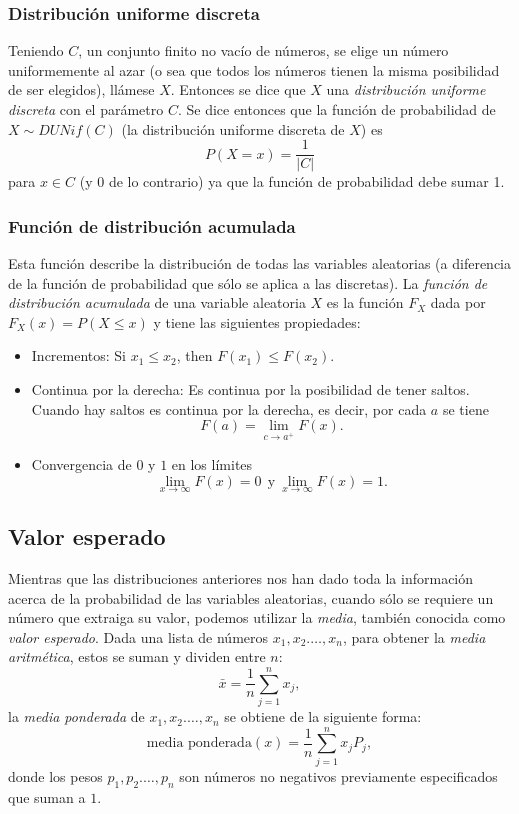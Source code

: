 \documentclass[12pt,letterpaper]{article}
\begin{document}
\subsubsection {Distribución uniforme discreta}
Teniendo $C$, un conjunto finito no vacío de números, se elige un número uniformemente al azar (o sea que todos los números tienen la misma posibilidad de ser elegidos), llámese $X$. Entonces se dice que $X$ una \emph{distribución uniforme discreta} con el parámetro $C$. Se dice entonces que la función de probabilidad de $X \sim DUNif(C)$ (la distribución uniforme discreta de $X$) es
\begin{equation}
P(X=x)=\frac{1}{|C|}
\end{equation}
para $x \in C$ (y $0$ de lo contrario) ya que la función de probabilidad debe sumar 1.
\subsubsection {Función de distribución acumulada}
Esta función describe la distribución de todas las variables aleatorias (a diferencia de la función de probabilidad que sólo se aplica a las discretas). La \emph{función de distribución acumulada} de una variable aleatoria $X$ es la función $F_X$ dada por $F_X(x)=P(X\leq x)$ y tiene las siguientes propiedades:
\begin{itemize}
    \item Incrementos: Si $x_1\leq x_2$, then $F(x_1)\leq F(x_2)$.
    \item Continua por la derecha: Es continua por la posibilidad de tener saltos. Cuando hay saltos es continua por la derecha, es decir, por cada $a$ se tiene
    \begin{equation}
    F(a)=\lim_{c\to a^+}F(x).
    \end{equation}
    \item Convergencia de $0$ y $1$ en los límites
    \begin{equation}
    \lim_{x\to \infty}F(x)=0\ \ \text{y}\ \lim_{x\to \infty}F(x)=1.
    \end{equation}
\end{itemize}
\subsection {Valor esperado}
Mientras que las distribuciones anteriores nos han dado toda la información acerca de la probabilidad de las variables aleatorias, cuando sólo se requiere un número que extraiga su valor, podemos utilizar la \emph{media}, también conocida como \emph{valor esperado}. Dada una lista de números $x_1,x_2.\ldots,x_n$, para obtener la \emph{media aritmética}, estos se suman y dividen entre $n$:
\begin{equation}
\bar{x}=\frac{1}{n}\sum_{j=1}^{n}x_j,
\end{equation}
la \emph{media ponderada} de $x_1,x_2.\ldots,x_n$ se obtiene de la siguiente forma:
\begin{equation}
\text{media ponderada}(x)=\frac{1}{n}\sum_{j=1}^{n}x_jP_j,
\end{equation}
donde los pesos $p_1,p_2.\ldots,p_n$ son números no negativos previamente especificados que suman a $1$.
\end{document}
